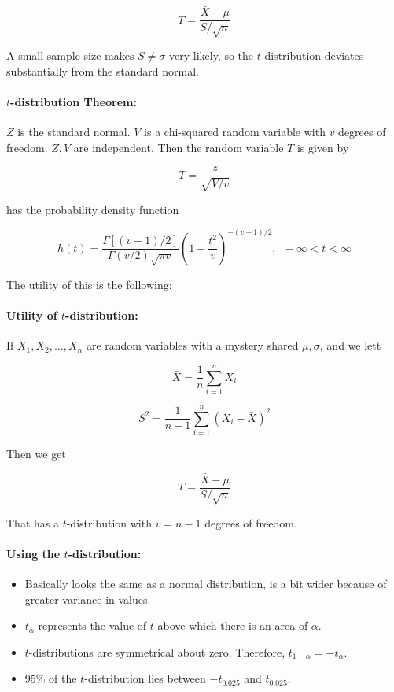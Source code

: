 \documentclass[a4paper,12pt]{report}
\begin{document}
$$T = \frac{\bar{X} - \mu}{S/\sqrt{n}}$$

A small sample size makes $S \neq \sigma$ very likely, so the $t$-distribution deviates substantially from the standard normal. 

\paragraph{$t$-distribution Theorem: } $Z$ is the standard normal. $V$ is a chi-squared random variable with $v$ degrees of freedom. $Z, V$ are independent. Then the random variable $T$ is given by 

$$T = \frac{z}{\sqrt{V/v}}$$

has the probability density function

$$h(t) = \frac{\Gamma[(v+1)/2]}{\Gamma(v/2)\sqrt{\pi v}} (1 + \frac{t^2}{v})^{-(v+1)/2}, \,\,\, -\infty < t < \infty$$

The utility of this is the following: 

\paragraph{Utility of $t$-distribution: } If $X_1, X_2, ..., X_n$ are random variables with a mystery shared $\mu, \sigma$, and we lett 

$$\bar{X} = \frac{1}{n} \sum_{i = 1}^n X_i  $$

$$S^2 = \frac{1}{n-1} \sum_{i = 1}^n (X_i - \bar{X})^2$$

Then we get 

$$T = \frac{\bar{X} - \mu}{S/\sqrt{n}}$$

That has a $t$-distribution with $v = n-1$ degrees of freedom.

\paragraph{Using the $t$-distribution: } 
\begin{itemize}
\item Basically looks the same as a normal distribution, is a bit wider because of greater variance in values. 
\item $t_\alpha$ represents the value of $t$ above which there is an area of $\alpha$. 
\item $t$-distributions are symmetrical about zero. Therefore, $t_{1-\alpha} = -t_\alpha$. 
\item 95\% of the $t$-distribution lies between $-t_0.025$ and $t_0.025$. 
\end{itemize}
\end{document}
